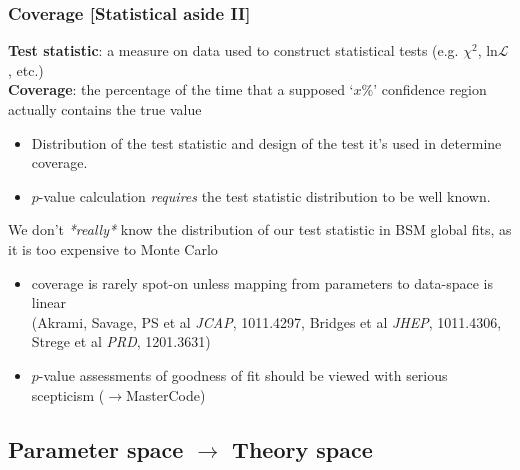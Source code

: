 \documentclass[xcolor=dvipsnames]{beamer}
\newcommand{\cblue}[1]{{\color[rgb]{0.1, 0.0, 0.6} #1}}
\begin{document}
\begin{frame}
\frametitle{Coverage [\alert{Statistical aside II}]}

{\scriptsize
\textbf{Test statistic}: a measure on data used to construct statistical tests (e.g. $\chi^2$, ln$\mathcal{L}$, etc.)\\
\textbf{Coverage}: the percentage of the time that a supposed `$x\%$' confidence region\\ actually contains the true value\\
\begin{itemize}
\item Distribution of the test statistic and design of the test it's used in determine coverage.
\item $p$-value calculation \textit{requires} the test statistic distribution to be well known.
\end{itemize}
}\vspace{3mm}

\cblue{We don't \textit{*really*} know the distribution of our test statistic in BSM global fits, as it is too expensive to Monte Carlo}
      \begin{itemize}\footnotesize
                 \item coverage is rarely spot-on unless mapping from parameters to data-space is linear \\
                 {\tiny(Akrami, Savage, PS et al {\it JCAP}, 1011.4297, Bridges et al {\it JHEP}, 1011.4306, Strege et al {\it PRD}, 1201.3631)}
                 \item $p$-value assessments of goodness of fit should be viewed with serious scepticism ($\rightarrow$MasterCode)
                 \end{itemize}

\end{frame}


\subsection{Parameter space $\rightarrow$ Theory space}
\end{document}
